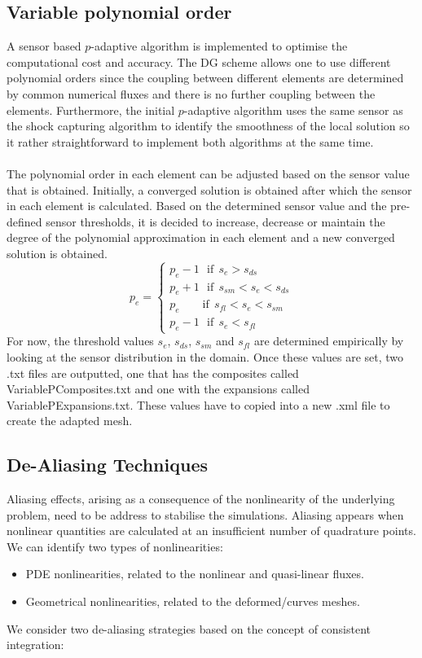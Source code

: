 \subsection{Variable polynomial order}
A sensor based $p$-adaptive algorithm is implemented to optimise the computational cost and accuracy.
The DG scheme allows one to use different polynomial orders since the coupling between different elements are determined by common numerical fluxes and there is no further 
coupling between the elements. Furthermore, the initial $p$-adaptive algorithm 
uses the same sensor as the shock capturing algorithm to identify the smoothness 
of the local solution so it rather straightforward to implement both algorithms 
at the same time.\\
\\
The polynomial order in each element can be adjusted based on the sensor value 
that is obtained. Initially, a converged solution is obtained after which the sensor 
in each element is calculated. Based on the determined sensor value and the 
pre-defined sensor thresholds, it is decided to increase, decrease or maintain 
the degree of the polynomial approximation in each element and a new converged 
solution is obtained.\\
\begin{equation}\label{eq:pswitch}
  p_e =\left \{ \begin{array}{l}
    p_e-1\	\	\ \mbox{if}\		\	 s_e>s_{ds}\\
    p_e+1\	\	\ \mbox{if}\		\	 s_{sm }<s_e<s_{ds}\\
    p_e\	\	\	\	\	\	\	\	\	 \mbox{if}\		\ s_{fl}<s_e<s_{sm}\\
    p_e-1\	\	\ \mbox{if}\		\	 s_e<s_{fl}
    \end{array}
    \right.
\end{equation}
For now, the threshold values $s_e$, $s_{ds}$, $s_{sm}$ and $s_{fl}$ are determined 
empirically by looking at the sensor distribution in the domain. Once these values 
are set, two .txt files are outputted, one that has the composites called VariablePComposites.txt 
and one with the expansions called VariablePExpansions.txt. These values have 
to copied into a new .xml file to create the adapted mesh.
\subsection{De-Aliasing Techniques}
Aliasing effects, arising as a consequence of the nonlinearity of the
underlying problem, need to be address to stabilise the simulations. Aliasing
appears when nonlinear quantities are calculated at an insufficient number of
quadrature points. We can identify two types of nonlinearities:
\begin{itemize}
\item PDE nonlinearities, related to the nonlinear and quasi-linear fluxes.
\item Geometrical nonlinearities, related to the deformed/curves meshes.
\end{itemize}
We consider two de-aliasing strategies based on the concept of consistent integration:

